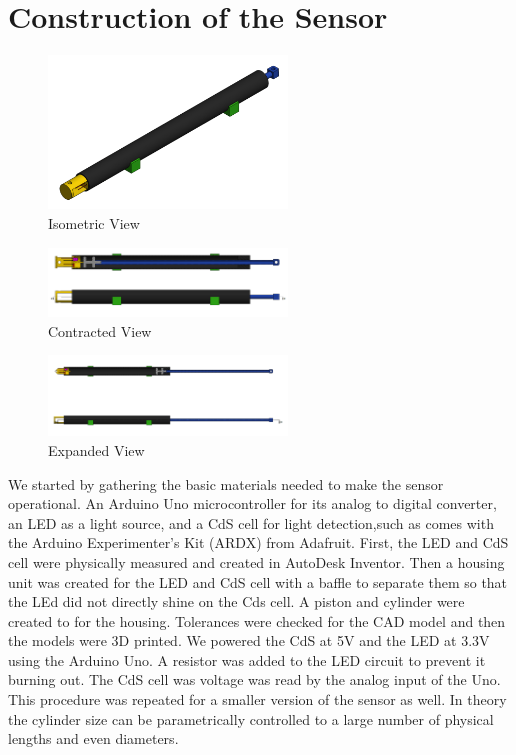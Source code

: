 \documentclass[10pt,conference,compsocconf]{IEEEtran}
\begin{document}
\section{Construction of the Sensor}

\begin{figure}
  \centering
  \includegraphics[width=2.5in]{figures/IsometricView.png}
  \caption{Isometric View}  
\end{figure}

\begin{figure}
  \centering
  \includegraphics[width=2.5in]{figures/Contracted.png}
  \caption{Contracted View}  
\end{figure}

\begin{figure}
  \centering
  \includegraphics[width=2.5in]{figures/Expanded.png}
  \caption{Expanded View}  
\end{figure}

We started by gathering the basic materials needed to make the sensor
operational. An Arduino Uno microcontroller for its analog to digital
converter, an LED as a light source, and a CdS cell for light
detection,such as comes with the Arduino Experimenter’s Kit (ARDX)
from Adafruit. First, the LED and CdS cell were physically measured
and created in AutoDesk Inventor. Then a housing unit was created for
the LED and CdS cell with a baffle to separate them so that the LEd
did not directly shine on the Cds cell. A piston and cylinder were
created to for the housing. Tolerances were checked for the CAD model
and then the models were 3D printed. We powered the CdS at 5V and the
LED at 3.3V using the Arduino Uno. A resistor was added to the LED
circuit to prevent it burning out. The CdS cell was voltage was read
by the analog input of the Uno. This procedure was repeated for a
smaller version of the sensor as well. In theory the cylinder size can
be parametrically controlled to a large number of physical lengths and
even diameters.
\end{document}
